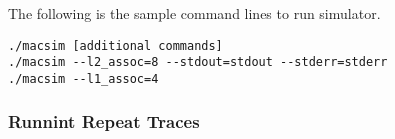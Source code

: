 The following is the sample command lines to run \SIM simulator.

\smallskip
\begin{lstlisting}
./macsim [additional commands]
./macsim --l2_assoc=8 --stdout=stdout --stderr=stderr
./macsim --l1_assoc=4 
\end{lstlisting}
\smallskip



\subsubsection{Runnint Repeat Traces} 

